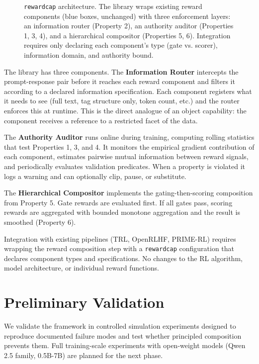 \documentclass[11pt,a4paper]{article}
\begin{document}
\begin{figure}[h]
\begin{tikzpicture}
\end{tikzpicture}
\caption{\texttt{rewardcap} architecture. The library wraps existing reward components (blue boxes, unchanged) with three enforcement layers: an information router (Property 2), an authority auditor (Properties 1, 3, 4), and a hierarchical compositor (Properties 5, 6). Integration requires only declaring each component's type (gate vs. scorer), information domain, and authority bound.}
\label{fig:arch}
\end{figure}

The library has three components. The \textbf{Information Router} intercepts the prompt-response pair before it reaches each reward component and filters it according to a declared information specification. Each component registers what it needs to see (full text, tag structure only, token count, etc.) and the router enforces this at runtime. This is the direct analogue of an object capability: the component receives a reference to a restricted facet of the data.

The \textbf{Authority Auditor} runs online during training, computing rolling statistics that test Properties 1, 3, and 4. It monitors the empirical gradient contribution of each component, estimates pairwise mutual information between reward signals, and periodically evaluates validation predicates. When a property is violated it logs a warning and can optionally clip, pause, or substitute.

The \textbf{Hierarchical Compositor} implements the gating-then-scoring composition from Property 5. Gate rewards are evaluated first. If all gates pass, scoring rewards are aggregated with bounded monotone aggregation and the result is smoothed (Property 6).

Integration with existing pipelines (TRL, OpenRLHF, PRIME-RL) requires wrapping the reward composition step with a \texttt{rewardcap} configuration that declares component types and specifications. No changes to the RL algorithm, model architecture, or individual reward functions.

\section{Preliminary Validation}

We validate the framework in controlled simulation experiments designed to reproduce documented failure modes and test whether principled composition prevents them. Full training-scale experiments with open-weight models (Qwen 2.5 family, 0.5B-7B) are planned for the next phase.
\end{document}
